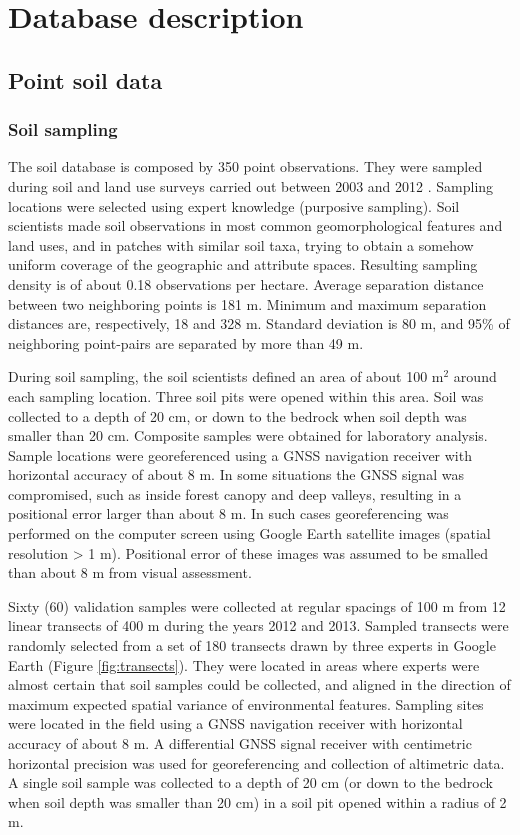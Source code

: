 \artigofalse
\chapter{Database description}
\label{anex:database}
\tocless\section{Point soil data}
\tocless\subsection{Soil sampling}

The soil database is composed by 350 point observations. They were sampled during soil and land use surveys carried out between 2003 and 2012 \cite{Pedron2005, SamuelRosaEtAl2011a, MiguelEtAl2012}. Sampling locations were selected using expert knowledge (purposive sampling). Soil scientists made soil observations in most common geomorphological features and land uses, and in patches with similar soil taxa, trying to obtain a somehow uniform coverage of the geographic and attribute spaces. Resulting sampling density is of about 0.18 observations per hectare. Average separation distance between two neighboring points is 181 m. Minimum and maximum separation distances are, respectively, 18 and 328 m. Standard deviation is 80 m, and 95\% of neighboring point-pairs are separated by more than 49 m.

During soil sampling, the soil scientists defined an area of about 100 m$^2$ around each sampling location. Three soil pits were opened within this area. Soil was collected to a depth of 20 cm, or down to the bedrock when soil depth was smaller than 20 cm. Composite samples were obtained for laboratory analysis. Sample locations were georeferenced using a GNSS navigation receiver with horizontal accuracy of about 8 m. In some situations the GNSS signal was compromised, such as inside forest canopy and deep valleys, resulting in a positional error larger than about 8 m. In such cases georeferencing was performed on the computer screen using Google Earth\textregistered{} satellite images (spatial resolution > 1 m). Positional error of these images was assumed to be smalled than about 8 m from visual assessment.

Sixty (60) validation samples were collected at regular spacings of 100 m from 12 linear transects of 400 m during the years 2012 and 2013. Sampled transects were randomly selected from a set of 180 transects drawn by three experts in Google Earth\textregistered{} (Figure \ref{fig:transects}). They were located in areas where experts were almost certain that soil samples could be collected, and aligned in the direction of maximum expected spatial variance of environmental features. Sampling sites were located in the field using a GNSS navigation receiver with horizontal accuracy of about 8 m. A differential GNSS signal receiver with centimetric horizontal precision was used for georeferencing and collection of altimetric data. A single soil sample was collected to a depth of 20 cm (or down to the bedrock when soil depth was smaller than 20 cm) in a soil pit opened within a radius of 2 m.

